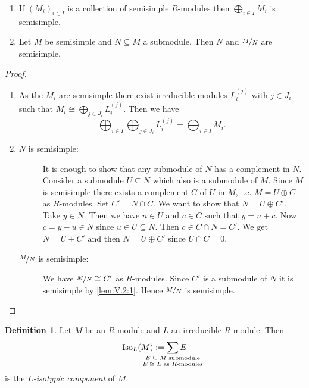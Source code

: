 \documentclass[12pt,a4paper]{scrartcl}
\theoremstyle{cplain}
\theoremstyle{cplain}
\theoremstyle{cplain}
\theoremstyle{definition}
\newtheorem*{deff}{Definition}
\begin{document}
\begin{otherlanguage}{english}
\begin{lem} \label{lem:V.2}
  \leavevmode
  \begin{enumerate}
    \item If $(M_i)_{i\in I}$ is a collection of semisimple $R$-modules then $\bigoplus_{i\in I}M_i$ is semisimple. \label{lem:V.2:1}
    \item Let $M$ be semisimple and $N\subseteq M$ a submodule. Then $N$ and $\nicefrac{M}{N}$ are semisimple. \label{lem:V.2:2}
  \end{enumerate}
\end{lem}
\begin{proof}
  \leavevmode
  \begin{enumerate}[label=\ref{lem:V.2:\arabic*}]
    \item As the $M_i$ are semisimple there exist irreducible modules $L_i^{(j)}$ with $j \in J_i$ such that $M_i \cong \bigoplus_{j\in J_i}L_i^{(j)}$. Then we have \[\bigoplus_{i\in I}\bigoplus_{j\in J_i}L_i^{(j)} = \bigoplus_{i\in I} M_i.\]
    \item \begin{description}
      \item[$N$ is semisimple:] It is enough to show that any submodule of $N$ has a complement in $N$. Consider a submodule $U\subseteq N$ which also is a submodule of $M$. Since $M$ is semisimple there exists a complement $C$ of $U$ in $M$, i.e. $M= U \oplus C$ as $R$-modules. Set $C' = N\cap C$. We want to show that $N=U \oplus C'$. Take $y \in N$. Then we have $n\in U$ and $c \in C$ such that $y=u+c$. Now $c = y-u\in N$ since $u\in U \subseteq N$. Then $c \in C \cap N = C'$. We get $N = U+C'$ and then $N=U\oplus C'$ since $U\cap C=0$.
      \item[$\nicefrac{M}{N}$ is semisimple:] We have $\nicefrac{M}{N} \cong C'$ as $R$-modules. Since $C'$ is a submodule of $N$ it is semisimple by \ref{lem:V.2:1}. Hence $\nicefrac{M}{N}$ is semisimple.
      \qedhere
    \end{description}
  \end{enumerate}
\end{proof}


\begin{deff}
  Let $M$ be an $R$-module and $L$ an irreducible $R$-module. Then \[\Iso_L(M) := \sum_{\mathclap{\substack{\text{$E \subseteq M$ submodule}\\\text{$E\cong L$ as $R$-modules}}}}E \] is the \emph{$L$-isotypic component} of $M$.
\end{deff}


\end{otherlanguage}
\end{document}

